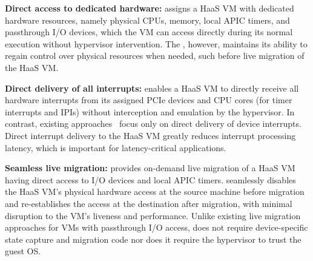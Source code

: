 %
%
%

%
{\bf Direct access to dedicated hardware:} 
\na assigns a HaaS VM with 
dedicated hardware resources, namely 
physical CPUs, memory, local APIC timers, and passthrough I/O devices,
which the VM can access directly 
during its normal execution without hypervisor intervention. 
The \sna, however, maintains its ability to
regain control over physical resources when needed, such 
before live migration of the HaaS VM.


{\bf Direct delivery of all interrupts:}
\na enables a HaaS VM to directly receive all hardware interrupts from 
its assigned PCIe devices and CPU cores (for timer interrupts and IPIs) 
without interception and emulation by the hypervisor.
In contrast, existing approaches~\cite{vfio,postedinterrupt,amit:2015,tu:2015}
focus only on direct delivery of device interrupts.
Direct interrupt delivery to the HaaS VM greatly
reduces interrupt processing latency, which is important for 
latency-critical applications.


{\bf Seamless live migration:}
\na provides on-demand live migration of a HaaS VM having direct access to 
I/O devices and local APIC timers. 
\na seamlessly disables the HaaS VM's physical hardware access at the 
source machine before migration and 
re-establishes the access at the destination after migration,
with minimal disruption to the VM's liveness and performance.
Unlike existing live migration~\cite{vfio-live-migration,blmvisor-journal,ondemand} 
approaches for VMs with passthrough 
I/O access, \na does not require device-specific state capture and migration code 
nor does it require the hypervisor to trust the guest OS. 

